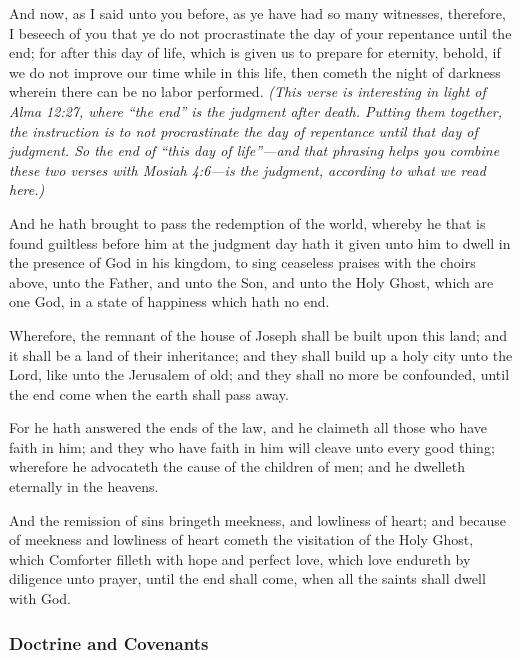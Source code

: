 \begin{compactdesc}
			\item[Alma 34:33] And now, as I said unto you before, as ye have had so many witnesses, therefore, I beseech of you that ye do not procrastinate the day of your repentance until the end; for after this day of life, which is given us to prepare for eternity, behold, if we do not improve our time while in this life, then cometh the night of darkness wherein there can be no labor performed. \textit{(This verse is interesting in light of Alma 12:27, where ``the end'' is the judgment after death. Putting them together, the instruction is to not procrastinate the day of repentance until that day of judgment. So the end of ``this day of life''---and that phrasing helps you combine these two verses with Mosiah 4:6---is the judgment, according to what we read here.)}
			\item[Mormon 7:7]  And he hath brought to pass the redemption of the world, whereby he that is found guiltless before him at the judgment day hath it given unto him to dwell in the presence of God in his kingdom, to sing ceaseless praises with the choirs above, unto the Father, and unto the Son, and unto the Holy Ghost, which are one God, in a state of happiness which hath no end.
			\item[Ether 13:8] Wherefore, the remnant of the house of Joseph shall be built upon this land; and it shall be a land of their inheritance; and they shall build up a holy city unto the Lord, like unto the Jerusalem of old; and they shall no more be confounded, until the end come when the earth shall pass away.
			\item[Moroni 7:28] For he hath answered the ends of the law, and he claimeth all those who have faith in him; and they who have faith in him will cleave unto every good thing; wherefore he advocateth the cause of the children of men; and he dwelleth eternally in the heavens.
			\item[Moroni 8:26] And the remission of sins bringeth meekness, and lowliness of heart; and because of meekness and lowliness of heart cometh the visitation of the Holy Ghost, which Comforter filleth with hope and perfect love, which love endureth by diligence unto prayer, until the end shall come, when all the saints shall dwell with God.
		\end{compactdesc}
		
	\subsubsection{Doctrine and Covenants} %
		\label{END-DC}
	
